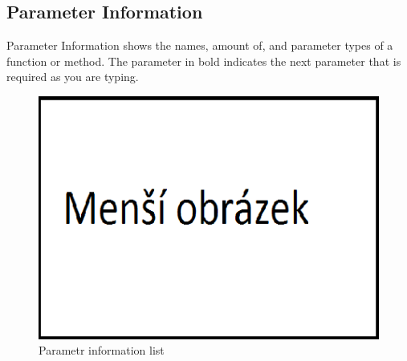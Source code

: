                 \subsection{Parameter Information}
                    Parameter Information shows the names, amount of, and parameter types of a function or method. The
                    parameter in bold indicates the next parameter that is required as you are typing.
                    \begin{figure}
                        \centering{}
                        \includegraphics [scale=0.3]{img/mensi_obrazek.png}
                        \caption{Parametr information list}
                    \end{figure}

